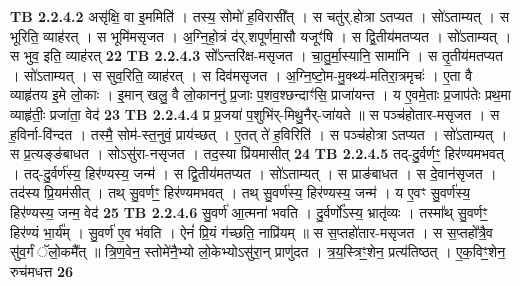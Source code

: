 \documentclass[17pt]{extarticle}
\begin{document}
                  \newline
                                \textbf{ TB 2.2.4.2} \newline
                  असृ॑क्षि॒ वा इ॒ममिति॑ । तस्य॒ सोमो॑ ह॒विरासी᳚त् । स चतु॑र्.होत्रा ऽतप्यत । सो॑ऽताम्यत् । स भूरिति॒ व्याह॑रत् । स भूमि॑मसृजत । अ॒ग्नि॒हो॒त्रं द॑र्.शपूर्णमा॒सौ यजूꣳ॑षि । स द्वि॒तीय॑मतप्यत । सो॑ऽताम्यत् । स भुव॒ इति॒ व्याह॑रत् \textbf{ 22} \newline
                  \newline
                                \textbf{ TB 2.2.4.3} \newline
                  सो᳚ऽन्तरि॑क्ष-मसृजत । चा॒तु॒र्मा॒स्यानि॒ सामा॑नि । स तृ॒तीय॑मतप्यत । सो॑ऽताम्यत् । स सुव॒रिति॒ व्याह॑रत् । स दिव॑मसृजत । अ॒ग्नि॒ष्टो॒म-मु॒क्थ्य॑-मतिरा॒त्रमृचः॑ । ए॒ता वै व्याहृ॑तय इ॒मे लो॒काः । इ॒मान् खलु॒ वै लो॒काननु॑ प्र॒जाः प॒शव॒श्छन्दाꣳ॑सि॒ प्राजा॑यन्त । य ए॒वमे॒ताः प्र॒जाप॑तेः प्रथ॒मा व्याहृ॑तीः॒ प्रजा॑ता॒ वेद॑ \textbf{ 23} \newline
                  \newline
                                \textbf{ TB 2.2.4.4} \newline
                  प्र प्र॒जया॑ प॒शुभि॑र्-मिथु॒नैर्-जा॑यते ॥ स पञ्च॑होतार-मसृजत । स ह॒विर्ना-वि॑न्दत । तस्मै॒ सोम॑-स्त॒नुवं॒ प्राय॑च्छत् । ए॒तत् ते॑ ह॒विरिति॑ । स पञ्च॑होत्रा ऽतप्यत । सो॑ऽताम्यत् । स प्र॒त्यङ्ङ॑बाधत । सोऽसु॑रा-नसृजत । तद॒स्या प्रि॑यमासीत् \textbf{ 24} \newline
                  \newline
                                \textbf{ TB 2.2.4.5} \newline
                  तद्-दु॒र्वर्णꣳ॒॒ हिर॑ण्यमभवत् । तद्-दु॒र्वर्ण॑स्य॒ हिर॑ण्यस्य॒ जन्म॑ । स द्वि॒तीय॑मतप्यत । सो॑ऽताम्यत् । स प्राङ॑बाधत । स दे॒वान॑सृजत । तद॑स्य प्रि॒यम॑सीत् । तथ् सु॒वर्णꣳ॒॒ हिर॑ण्यमभवत् । तथ् सु॒वर्ण॑स्य॒ हिर॑ण्यस्य॒ जन्म॑ । य ए॒वꣳ सु॒वर्ण॑स्य॒ हिर॑ण्यस्य॒ जन्म॒ वेद॑ \textbf{ 25} \newline
                  \newline
                                \textbf{ TB 2.2.4.6} \newline
                  सु॒वर्ण॑ आ॒त्मना॑ भवति । दु॒र्वर्णो᳚ऽस्य॒ भ्रातृ॑व्यः । तस्मा᳚थ् सु॒वर्णꣳ॒॒ हिर॑ण्यं भा॒र्य᳚म् । सु॒वर्ण॑ ए॒व भ॑वति । ऐनं॑ प्रि॒यं ग॑च्छति॒ नाप्रि॑यम् ॥ स स॒प्तहो॑तार-मसृजत । स स॒प्तहो᳚त्रै॒व सु॑व॒र्गं ॅलो॒कमै᳚त् ॥ त्रि॒ण॒वेन॒ स्तोमे॑नै॒भ्यो लो॒केभ्योऽसु॑रा॒न् प्राणु॑दत । त्र॒य॒स्त्रिꣳ॒॒शेन॒ प्रत्य॑तिष्ठत् । ए॒क॒विꣳ॒॒शेन॒ रुच॑मधत्त \textbf{ 26} \newline
\end{document}
